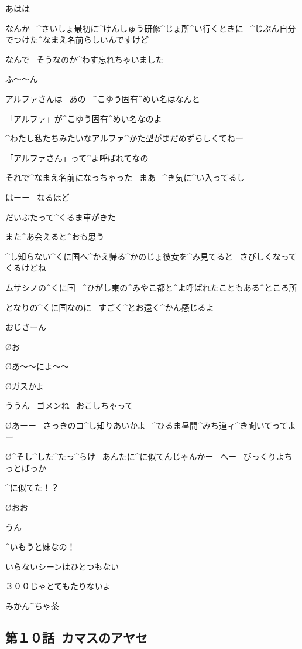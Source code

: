 \K あはは

\K なんか
\ ^{さいしょ}{最初}に^{けんしゅう}{研修}^{じょ}{所}^{い}{行}くときに
\ ^{じぶん}{自分}でつけた^{なまえ}{名前}らしいんですけど

\K なんで
\ そうなのか^{わす}{忘}れちゃいました

\A ふ〜〜ん

\page
\K アルファさんは
\ あの
\ ^{こゆう}{固有}^{めい}{名}はなんと

\A 「アルファ」が^{こゆう}{固有}^{めい}{名}なのよ

\A ^{わたし}{私}たちみたいなアルファ^{かた}{型}がまだめずらしくてねー

\A 「アルファさん」って^{よ}{呼}ばれてなの

\A それで^{なまえ}{名前}になっちゃった
\ まあ
\ ^{き}{気}に^{い}{入}ってるし

\K はーー
\ なるほど

\page
\A だいぶたって^{くるま}{車}がきた

\A また^{あ}{会}えると^{おも}{思}う

\A ^{し}{知}らない^{くに}{国}へ^{かえ}{帰}る^{かのじょ}{彼女}を^{み}{見}てると
\ さびしくなってくるけどね

\page
\A ムサシノの^{くに}{国}
\ ^{ひがし}{東}の^{みやこ}{都}と^{よ}{呼}ばれたこともある^{ところ}{所}

\A となりの^{くに}{国}なのに
\ すごく^{とお}{遠}く^{かん}{感}じるよ

\page
\A おじさーん

\O お

\O あ〜〜によ〜〜

\page
\O ガスかよ

\A ううん
\ ゴメンね
\ おこしちゃって

\O あーー
\ さっきのコ^{し}{知}りあいかよ
\ ^{ひるま}{昼間}^{みち}{道}ィ^{き}{聞}いてってよー

\O ^{そ}{し}^{し}{た}^{た}{っ}^{ら}{け}
\ あんたに^{に}{似}てんじゃんかー
\ へー
\ びっくりよちっとばっか

\A ^{に}{似}てた！？

\O おお

\page
\A うん

\A ^{いもうと}{妹}なの！

\A いらないシーンはひとつもない

\A ３００じゃとてもたりないよ

\Sign みかん^{ちゃ}{茶}


\subsection{第１０話\ カマスのアヤセ}


